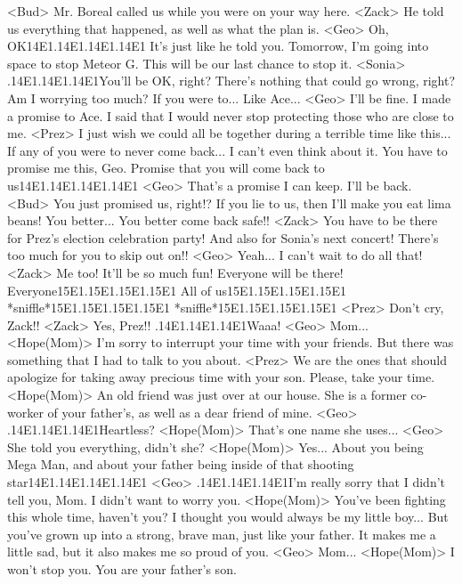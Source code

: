 <Bud> Mr. Boreal called us while you were on your way here. 
<Zack> He told us everything that happened, as well as what the plan is. 
<Geo> Oh, OK{14}{E1}.{14}{E1}.{14}{E1}.{14}{E1} 
It's just like he told you. 
Tomorrow, I'm going into space to stop Meteor G. 
This will be our last chance to stop it. 
<Sonia> .{14}{E1}.{14}{E1}.{14}{E1}You'll be OK, right? 
There's nothing that could go wrong, right? 
Am I worrying too much? 
If you were to... Like Ace... 
<Geo> I'll be fine. 
I made a promise to Ace. 
I said that I would never stop protecting those who are close to me. 
<Prez> I just wish we could all be together during a terrible time like this... 
If any of you were to never come back... I can't even think about it. 
You have to promise me this, Geo. 
Promise that you will come back to us{14}{E1}.{14}{E1}.{14}{E1}.{14}{E1} 
<Geo> That's a promise I can keep. I'll be back. 
<Bud> You just promised us, right!? 
If you lie to us, then I'll make you eat lima beans! 
You better... You better come back safe!! 
<Zack> You have to be there for Prez's election celebration party! 
And also for Sonia's next concert! 
There's too much for you to skip out on!! 
<Geo> Yeah... I can't wait to do all that! 
<Zack> Me too! 
It'll be so much fun! 
Everyone will be there! 
Everyone{15}{E1}.{15}{E1}.{15}{E1}.{15}{E1} 
All of us{15}{E1}.{15}{E1}.{15}{E1}.{15}{E1} 
*sniffle*{15}{E1}.{15}{E1}.{15}{E1}.{15}{E1} *sniffle*{15}{E1}.{15}{E1}.{15}{E1}.{15}{E1} 
<Prez> Don't cry, Zack!! 
<Zack> Yes, Prez!! 
.{14}{E1}.{14}{E1}.{14}{E1}Waaa! 
<Geo> Mom... 
<Hope(Mom)> I'm sorry to interrupt your time with your friends. 
But there was something that I had to talk to you about. 
<Prez> We are the ones that should apologize for taking away precious time with your son. 
Please, take your time. 
<Hope(Mom)> An old friend was just over at our house. 
She is a former co-worker of your father's, as well as a dear friend of mine. 
<Geo> .{14}{E1}.{14}{E1}.{14}{E1}Heartless? 
<Hope(Mom)> That's one name she uses... 
<Geo> She told you everything, didn't she? 
<Hope(Mom)> Yes... 
About you being Mega Man, and about your father being inside of that shooting star{14}{E1}.{14}{E1}.{14}{E1}.{14}{E1} 
<Geo> .{14}{E1}.{14}{E1}.{14}{E1}I'm really sorry that I didn't tell you, Mom. 
I didn't want to worry you. 
<Hope(Mom)> You've been fighting this whole time, haven't you? 
I thought you would always be my little boy... 
But you've grown up into a strong, brave man, just like your father. 
It makes me a little sad, but it also makes me so proud of you. 
<Geo> Mom... 
<Hope(Mom)> I won't stop you. 
You are your father's son. 
